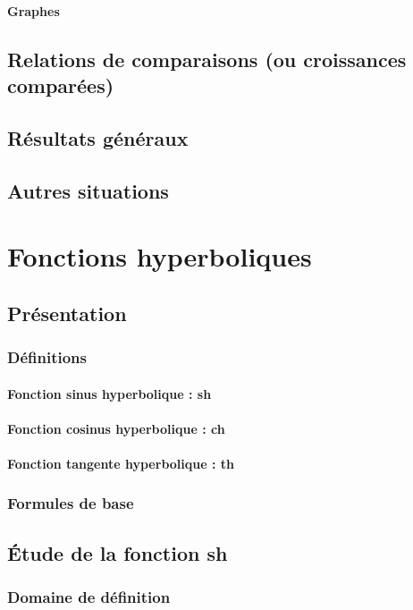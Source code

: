 \documentclass[12pt,a4paper,french]{book}
\begin{document}
			\subsubsection{Graphes}
	\section{Relations de comparaisons  (ou croissances comparées)}
		\section{Résultats généraux}
		\section{Autres situations}
		
\chapter{Fonctions hyperboliques}
	\section{Présentation}
		\subsection{Définitions}
			\subsubsection{Fonction sinus hyperbolique : sh}
			\subsubsection{Fonction cosinus hyperbolique : ch}
			\subsubsection{Fonction tangente hyperbolique : th}
		\subsection{Formules de base}
	\section{Étude de la fonction sh}
		\subsection{Domaine de définition}
\end{document}
